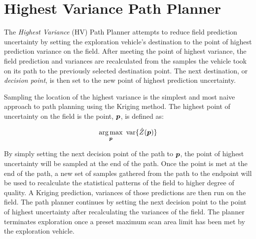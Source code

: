 \section{Highest Variance Path Planner} \label{sec:nhvpp}
The \textit{Highest Variance} (HV) Path Planner attempts to reduce field prediction uncertainty by setting the exploration vehicle's destination to the point of highest prediction variance on the field. After meeting the point of highest variance, the field prediction and variances are recalculated from the samples the vehicle took on its path to the previously selected destination point. The next destination, or \textit{decision point}, is then set to the new point of highest prediction uncertainty.

Sampling the location of the highest variance is the simplest and most naive approach to path planning using the Kriging method. The highest point of uncertainty on the field is the point, ${\it{\boldsymbol{p}}}$, is defined as:

\begin{equation}
\argmax_{\vect{p}} \ \text{var}\{\hat{Z}(\vect{p})\}
\end{equation}

By simply setting the next decision point of the path to ${\it{\boldsymbol{p}}}$, the point of highest uncertainty will be sampled at the end of the path. Once the point is met at the end of the path, a new set of samples gathered from the path to the endpoint will be used to recalculate the statistical patterns of the field to higher degree of quality. A Kriging prediction, variances of those predictions are then run on the field. The path planner continues by setting the next decision point to the point of highest uncertainty after recalculating the variances of the field. The planner terminates exploration once a preset maximum scan area limit has been met by the exploration vehicle.

